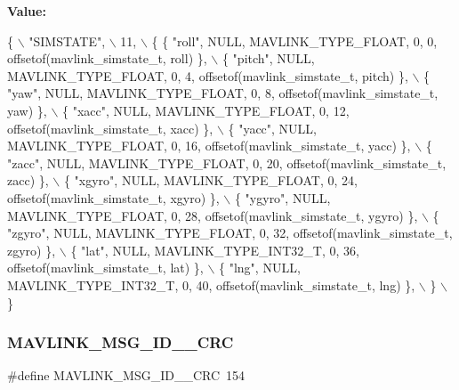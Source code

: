 {\bfseries Value\+:}
\begin{DoxyCode}
\{ \(\backslash\)
    \textcolor{stringliteral}{"SIMSTATE"}, \(\backslash\)
    11, \(\backslash\)
    \{  \{ \textcolor{stringliteral}{"roll"}, NULL, MAVLINK_TYPE_FLOAT, 0, 0, offsetof(mavlink_simstate_t, roll) \}, \(\backslash\)
         \{ \textcolor{stringliteral}{"pitch"}, NULL, MAVLINK_TYPE_FLOAT, 0, 4, offsetof(mavlink_simstate_t, pitch) \}, \(\backslash\)
         \{ \textcolor{stringliteral}{"yaw"}, NULL, MAVLINK_TYPE_FLOAT, 0, 8, offsetof(mavlink_simstate_t, yaw) \}, \(\backslash\)
         \{ \textcolor{stringliteral}{"xacc"}, NULL, MAVLINK_TYPE_FLOAT, 0, 12, offsetof(mavlink_simstate_t, xacc) \}, \(\backslash\)
         \{ \textcolor{stringliteral}{"yacc"}, NULL, MAVLINK_TYPE_FLOAT, 0, 16, offsetof(mavlink_simstate_t, yacc) \}, \(\backslash\)
         \{ \textcolor{stringliteral}{"zacc"}, NULL, MAVLINK_TYPE_FLOAT, 0, 20, offsetof(mavlink_simstate_t, zacc) \}, \(\backslash\)
         \{ \textcolor{stringliteral}{"xgyro"}, NULL, MAVLINK_TYPE_FLOAT, 0, 24, offsetof(mavlink_simstate_t, xgyro) \}, \(\backslash\)
         \{ \textcolor{stringliteral}{"ygyro"}, NULL, MAVLINK_TYPE_FLOAT, 0, 28, offsetof(mavlink_simstate_t, ygyro) \}, \(\backslash\)
         \{ \textcolor{stringliteral}{"zgyro"}, NULL, MAVLINK_TYPE_FLOAT, 0, 32, offsetof(mavlink_simstate_t, zgyro) \}, \(\backslash\)
         \{ \textcolor{stringliteral}{"lat"}, NULL, MAVLINK_TYPE_INT32_T, 0, 36, offsetof(mavlink_simstate_t, lat) \}, \(\backslash\)
         \{ \textcolor{stringliteral}{"lng"}, NULL, MAVLINK_TYPE_INT32_T, 0, 40, offsetof(mavlink_simstate_t, lng) \}, \(\backslash\)
         \} \(\backslash\)
\}
\end{DoxyCode}
\mbox{\label{mavlink__msg__simstate_8h_ae54787ffff331efca0dabf57afb0fd82}} 
\subsubsection{M\+A\+V\+L\+I\+N\+K\+\_\+\+M\+S\+G\+\_\+\+I\+D\+\_\+\_\+\+C\+RC}
{\footnotesize\ttfamily \#define M\+A\+V\+L\+I\+N\+K\+\_\+\+M\+S\+G\+\_\+\+I\+D\+\_\+\_\+\+C\+RC~154}

